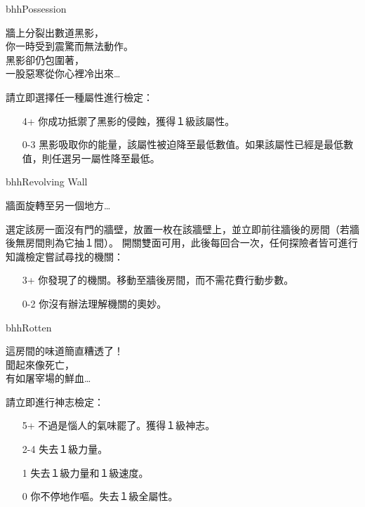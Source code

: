 \linebreak[0]%
\begin{EventCard}{bhh}{Possession}
  \begin{CardStory}
    牆上分裂出數道黑影，\\
    你一時受到震驚而無法動作。\\
    黑影卻仍包圍著，\\
    一股惡寒從你心裡冷出來…
  \end{CardStory}
  請立即選擇任一種屬性進行檢定：
  \begin{itemize}
    \item[4+] 你成功抵禦了黑影的侵蝕，獲得１級該屬性。
    \item[0-3] 黑影吸取你的能量，該屬性被迫降至最低數值。如果該屬性已經是最低數值，則任選另一屬性降至最低。
  \end{itemize}
\end{EventCard}%
\linebreak[0]%
\begin{EventCard}{bhh}{Revolving Wall}
  \begin{CardStory}
    牆面旋轉至另一個地方…
  \end{CardStory}
  選定該房一面沒有門的牆壁，放置一枚在該牆壁上，並立即前往牆後的房間（若牆後無房間則為它抽１間）。\smallbreak
  開關雙面可用，此後每回合一次，任何探險者皆可進行知識檢定嘗試尋找\ThisName{}的機關：
  \begin{itemize}
    \item[3+] 你發現了\ThisName{}的機關。移動至牆後房間，而不需花費行動步數。
    \item[0-2] 你沒有辦法理解機關的奧妙。
  \end{itemize}
\end{EventCard}%
\linebreak[0]%
\begin{EventCard}{bhh}{Rotten}
  \begin{CardStory}
    這房間的味道簡直糟透了！\\
    聞起來像死亡，\\
    有如屠宰場的鮮血…
  \end{CardStory}
  請立即進行神志檢定：
  \begin{itemize}
    \item[5+] 不過是惱人的氣味罷了。獲得１級神志。
    \item[2-4] 失去１級力量。
    \item[1] 失去１級力量和１級速度。
    \item[0] 你不停地作嘔。失去１級全屬性。
  \end{itemize}
\end{EventCard}%
